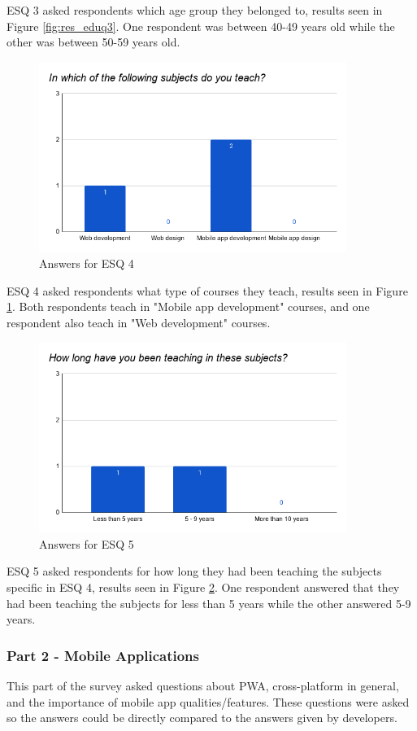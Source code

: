 \documentclass[a4paper,12pt]{article}
\begin{document}
ESQ 3 asked respondents which age group they belonged to, results seen in Figure \ref{fig:res_eduq3}. One respondent was between 40-49 years old while the other was between 50-59 years old.
\newpage

\begin{figure}[ht!]
    \centering
    \includegraphics[width=10cm]{img/Results/esq4.png}
    \caption{Answers for ESQ 4}
    \label{fig:res_eduq4}
\end{figure}

ESQ 4 asked respondents what type of courses they teach, results seen in Figure \ref{fig:res_eduq4}. Both respondents teach in "Mobile app development" courses, and one respondent also teach in "Web development" courses.

\begin{figure}[ht!]
    \centering
    \includegraphics[width=10cm]{img/Results/esq5.png}
    \caption{Answers for ESQ 5}
    \label{fig:res_eduq5}
\end{figure}

ESQ 5 asked respondents for how long they had been teaching the subjects specific in ESQ 4, results seen in Figure \ref{fig:res_eduq5}. One respondent answered that they had been teaching the subjects for less than 5 years while the other answered 5-9 years.

\subsubsection{Part 2 - Mobile Applications}
\label{Results_edu_part2}
This part of the survey asked questions about PWA, cross-platform in general, and the importance of mobile app qualities/features. These questions were asked so the answers could be directly compared to the answers given by developers.
\end{document}
